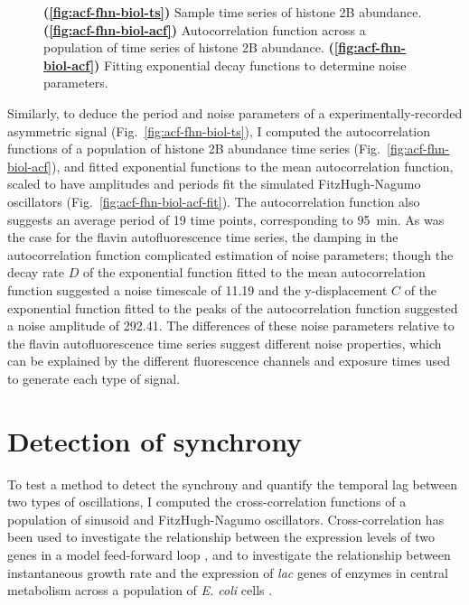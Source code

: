 \begin{figure}
  \caption{
    \textbf{(\ref{fig:acf-fhn-biol-ts})}
    Sample time series of histone 2B abundance.
    \textbf{(\ref{fig:acf-fhn-biol-acf})}
    Autocorrelation function across a population of time series of histone 2B abundance.
    \textbf{(\ref{fig:acf-fhn-biol-acf})}
    Fitting exponential decay functions to determine noise parameters.
  }
  \label{fig:acf-fhn-biol}
\end{figure}

Similarly, to deduce the period and noise parameters of a experimentally-recorded asymmetric signal (Fig.\ \ref{fig:acf-fhn-biol-ts}), I computed the autocorrelation functions of a population of histone 2B abundance time series (Fig.\ \ref{fig:acf-fhn-biol-acf}), and fitted exponential functions to the mean autocorrelation function, scaled to have amplitudes and periods fit the simulated FitzHugh-Nagumo oscillators (Fig.\ \ref{fig:acf-fhn-biol-acf-fit}).
The autocorrelation function also suggests an average period of 19 time points, corresponding to \SI{95}{\minute}.
As was the case for the flavin autofluorescence time series, the damping in the autocorrelation function complicated estimation of noise parameters; though the decay rate $D$ of the exponential function fitted to the mean autocorrelation function suggested a noise timescale of 11.19 and the y-displacement $C$ of the exponential function fitted to the peaks of the autocorrelation function suggested a noise amplitude of 292.41.
The differences of these noise parameters relative to the flavin autofluorescence time series suggest different noise properties, which can be explained by the different fluorescence channels and exposure times used to generate each type of signal.


\section{Detection of synchrony}
\label{sec:analysis-correlation}

To test a method to detect the synchrony and quantify the temporal lag between two types of oscillations, I computed the cross-correlation functions of a population of sinusoid and FitzHugh-Nagumo oscillators.
Cross-correlation has been used to investigate the relationship between the expression levels of two genes in a model feed-forward loop \parencite{dunlopRegulatoryActivityRevealed2008},
and to investigate the relationship between instantaneous growth rate and the expression of \textit{lac} genes of enzymes in central metabolism across a population of \textit{E. coli} cells \parencite{kivietStochasticityMetabolismGrowth2014}.

